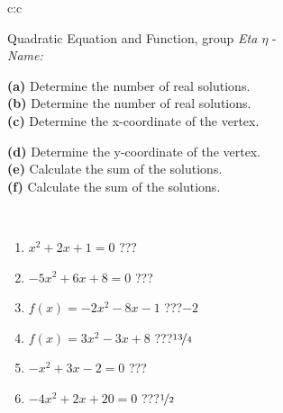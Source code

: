 \documentclass[10pt]{report}
\begin{document}
\begin{tabular}{c:c}
\begin{minipage}[c][104.5mm][t]{0.5\linewidth}
\begin{center}
\vspace{7mm}
{\huge {\LARGE Quadratic Equation and Function}, group \textit{Eta $\eta$} -}\\[5mm]
\textit{Name:}\phantom{xxxxxxxxxxxxxxxxxxxxxxxxxxxxxxxxxxxxxxxxxxxxxxxxxxxxxxxxxxxxxxxxx}\\[5mm]
\begin{minipage}{0.95\linewidth}
\begin{center}
{\small \begin{minipage}{0.5\textwidth}
\textbf{(a)} Determine the number of real solutions. \\[1mm]
\textbf{(b)} Determine the number of real solutions. \\[1mm]
\textbf{(c)} Determine the x-coordinate of the vertex.
\end{minipage} \begin{minipage}{0.49\textwidth}
\textbf{(d)} Determine the y-coordinate of the vertex. \\[1mm]
\textbf{(e)} Calculate the sum of the solutions. \\[1mm]
\textbf{(f)} Calculate the sum of the solutions.
\end{minipage}
}
\end{center}
\end{minipage}
\\[4mm]
\begin{minipage}{0.79\linewidth}
\begin{center}
\begin{varwidth}{\linewidth}
\begin{enumerate}
\Large
\item $x^2+2x+1=0$\quad \dotfill\; ???\;\dotfill {}
\item $-5x^2+6x+8=0$\quad \dotfill\; ???\;\dotfill {}
\item $f(x)=-2x^2-8x-1$\quad \dotfill\; ???\;\dotfill \quad $-2$
\item $f(x)=3x^2-3x+8$\quad \dotfill\; ???\;\dotfill \quad $\nicefrac{13}{4}$
\item $-x^2+3x-2=0$\quad \dotfill\; ???\;\dotfill {}
\item $-4x^2+2x+20=0$\quad \dotfill\; ???\;\dotfill \quad $\nicefrac{1}{2}$
\end{enumerate}
\end{varwidth}
\end{center}

\end{minipage}
\end{center}
\end{minipage}
\end{tabular}
\end{document}

